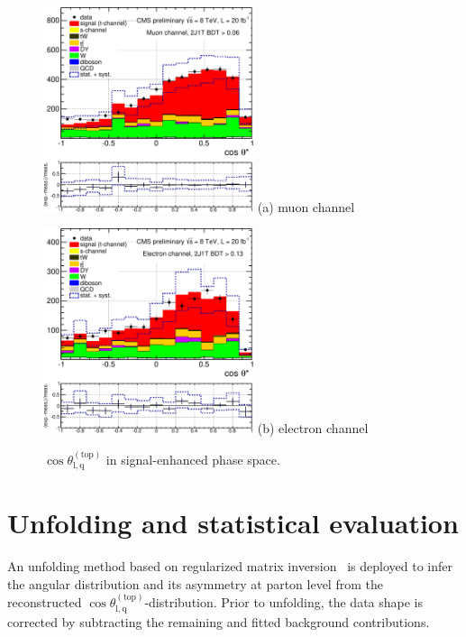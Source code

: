 \documentclass[a4paper]{jpconf}
\newcommand{\costheta}[0]{\cos\theta_{\mathrm{l,q}}^{\mathrm{(top)}}}
\begin{document}
\begin{figure}[h]
\begin{center}
\begin{minipage}{7cm}
\includegraphics[height=6.0cm]{2j1t_cosTheta_mu-crop}
\center (a) muon channel
\end{minipage}\hspace{1cm}%
\begin{minipage}{7cm}
\includegraphics[height=6.0cm]{2j1t_cosTheta_el-crop}
\center (b) electron channel
\end{minipage} 
\caption{\label{fig:recocostheta}$\costheta$ in signal-enhanced phase space.}
\vspace{-0.5cm}
\end{center}
\end{figure}


\section{Unfolding and statistical evaluation}
An unfolding method based on regularized matrix inversion~\cite{tunfold} is deployed to infer the angular distribution and its asymmetry at parton level from the reconstructed $\costheta$-distribution. Prior to unfolding, the data shape is corrected by subtracting the remaining and fitted background contributions.
\end{document}
